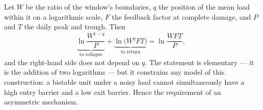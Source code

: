 \begin{ineq}
Let $W$ be the ratio of the window's boundaries, $q$ the position of the mean load within it on a logarithmic scale, $F$ the feedback factor at complete damage, and $P$ and $T$ the daily peak and trough. Then
\[\underbrace{\ln\frac{W^{1-q}}{P}}_{\text{to collapse}} + \underbrace{\ln\big(W^{q} F T\big)}_{\text{to return}} = \ln\frac{W F T}{P},\]
and the right-hand side does not depend on $q$. The statement is elementary --- it is the addition of two logarithms --- but it constrains any model of this construction: a bistable unit under a noisy load cannot simultaneously have a high entry barrier and a low exit barrier. Hence the requirement of an asymmetric mechanism.
\end{ineq}
